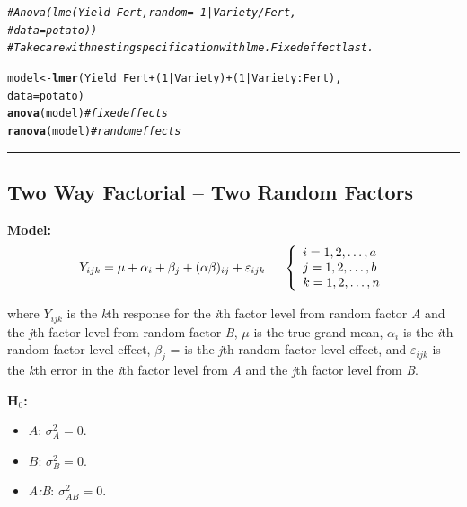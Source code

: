 \documentclass[12pt,english]{article}\usepackage[]{graphicx}\usepackage[table]{xcolor}
\makeatletter
\newcommand{\hlnum}[1]{\textcolor[rgb]{0.686,0.059,0.569}{#1}}%
\newcommand{\hlcom}[1]{\textcolor[rgb]{0.678,0.584,0.686}{\textit{#1}}}%
\newcommand{\hlopt}[1]{\textcolor[rgb]{0,0,0}{#1}}%
\newcommand{\hldef}[1]{\textcolor[rgb]{0.345,0.345,0.345}{#1}}%
\newcommand{\hlkwb}[1]{\textcolor[rgb]{0.69,0.353,0.396}{#1}}%
\newcommand{\hlkwc}[1]{\textcolor[rgb]{0.333,0.667,0.333}{#1}}%
\newcommand{\hlkwd}[1]{\textcolor[rgb]{0.737,0.353,0.396}{\textbf{#1}}}%
\newenvironment{kframe}{%
 \def\at@end@of@kframe{}%
 \ifinner\ifhmode%
  \def\at@end@of@kframe{\end{minipage}}%
  \begin{minipage}{\columnwidth}%
 \fi\fi%
 \def\FrameCommand##1{\hskip\@totalleftmargin \hskip-\fboxsep
 \colorbox{shadecolor}{##1}\hskip-\fboxsep
     \hskip-\linewidth \hskip-\@totalleftmargin \hskip\columnwidth}%
 \MakeFramed {\advance\hsize-\width
   \@totalleftmargin\z@ \linewidth\hsize
   \@setminipage}}%
 {\par\unskip\endMakeFramed%
 \at@end@of@kframe}
\newenvironment{knitrout}{}{} %
\makeatother
\begin{document}
\begin{tcolorbox}[colback=yellow!50!red!25!white,colbacktitle=yellow!50!red,colframe=black!75!white,title=\textbf{R:} Two Way Factorial -- One Fixed and One Random Factor]
\begin{knitrout}
\begin{kframe}
\begin{alltt}
\hlcom{# Anova(lme(Yield ~ Fert, random = ~ 1 | Variety/Fert,}
\hlcom{#           data = potato))}
\hlcom{# Take care with nesting specification with lme.  Fixed effect last.}

\hldef{model} \hlkwb{<-} \hlkwd{lmer}\hldef{(Yield} \hlopt{~} \hldef{Fert} \hlopt{+} \hldef{(}\hlnum{1}\hlopt{|}\hldef{Variety)} \hlopt{+} \hldef{(}\hlnum{1}\hlopt{|}\hldef{Variety}\hlopt{:}\hldef{Fert),}
           \hlkwc{data} \hldef{= potato)}
\hlkwd{anova}\hldef{(model)} \hlcom{# fixed effects}
\hlkwd{ranova}\hldef{(model)} \hlcom{# random effects}
\end{alltt}
\end{kframe}
\end{knitrout}
\end{tcolorbox}
\par\noindent\rule{.9\textwidth}{0.4pt}

\subsection{Two Way Factorial -- Two Random Factors}

\textbf{Model:} \[Y_{ijk} = \mu + \alpha_i + \beta_j + (\alpha\beta)_{ij} + \varepsilon_{ijk} \hspace{0.2in} \left\{
                \begin{array}{ll}
                  i = 1,2,\dots,a\\
                  j = 1,2,\dots,b\\
                  k = 1,2,\dots,n
                \end{array}
              \right.\]


\noindent where $Y_{ijk}$ is the \textit{k}th response for the \textit{i}th factor level from random factor \textit{A} and the \textit{j}th factor level from random factor \textit{B}, $\mu$ is the true grand mean, $\alpha_i$ is the \textit{i}th random factor level effect, $\beta_j$ = is the \textit{j}th random factor level effect, and $\varepsilon_{ijk}$ is the \textit{k}th error in the \textit{i}th factor level from \textit{A} and the \textit{j}th factor level from \textit{B}. \\
\vspace{0.05in}

\noindent \textbf{H$_0$:}
\begin{itemize}
\item $A$: $\sigma^2_A = 0$.
\item $B$: $\sigma^2_B = 0$.
\item \textit{A:B}: $\sigma^2_{AB}  = 0$.
\end{itemize}
\vspace{0.1in}
\end{document}
